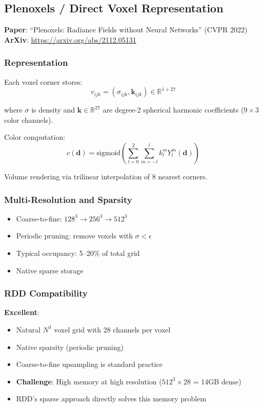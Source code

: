 \documentclass[11pt, a4paper]{article}
\begin{document}
\subsection{Plenoxels / Direct Voxel Representation}

\textbf{Paper}: ``Plenoxels: Radiance Fields without Neural Networks'' (CVPR 2022)\\
\textbf{ArXiv}: \url{https://arxiv.org/abs/2112.05131}

\subsubsection{Representation}

Each voxel corner stores:
\begin{equation}
    v_{ijk} = (\sigma_{ijk}, \mathbf{k}_{ijk}) \in \mathbb{R}^{1+27}
\end{equation}

where $\sigma$ is density and $\mathbf{k} \in \mathbb{R}^{27}$ are degree-2 spherical harmonic coefficients ($9 \times 3$ color channels).

Color computation:
\begin{equation}
    c(\mathbf{d}) = \text{sigmoid}\left(\sum_{l=0}^{2} \sum_{m=-l}^{l} k_l^m Y_l^m(\mathbf{d})\right)
\end{equation}

Volume rendering via trilinear interpolation of 8 nearest corners.

\subsubsection{Multi-Resolution and Sparsity}

\begin{itemize}
    \item Coarse-to-fine: $128^3 \to 256^3 \to 512^3$
    \item Periodic pruning: remove voxels with $\sigma < \epsilon$
    \item Typical occupancy: 5--20\% of total grid
    \item Native sparse storage
\end{itemize}

\subsubsection{RDD Compatibility}

\textbf{Excellent}:
\begin{itemize}
    \item Natural $N^3$ voxel grid with 28 channels per voxel
    \item Native sparsity (periodic pruning)
    \item Coarse-to-fine upsampling is standard practice
    \item \textbf{Challenge}: High memory at high resolution ($512^3 \times 28$ = 14GB dense)
    \item RDD's sparse approach directly solves this memory problem
\end{itemize}
\end{document}
